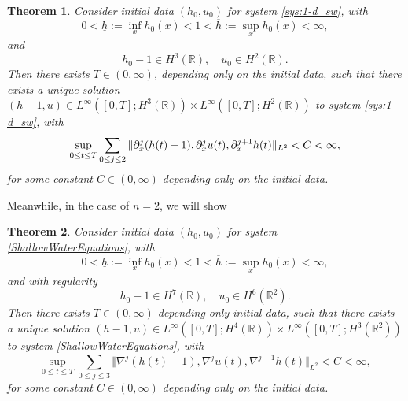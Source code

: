 \documentclass[reqno,11pt]{amsart}
\newcommand{\norm}[2]{\Vert #1 \Vert_{#2}}
\theoremstyle{plain}
\newtheorem{theorem}{Theorem}[section]
\theoremstyle{definition}
\numberwithin{equation}{section}
\begin{document}
\begin{theorem}
    \label{thm:1-d} Consider initial data $ (h_0, u_0)$ for system \eqref{sys:1-d_sw}, with
\begin{equation}
\label{h_initial-bound}
    0 < \underline h := \inf_{x} h_{0}(x) < 1 < \overline h := \sup_x h_{0}(x) < \infty,
\end{equation}
and
\begin{equation}
    \label{1-d-initial-regularity}
    h_0 - 1 \in H^3(\mathbb R), \quad  u_0 \in H^2(\mathbb R). 
\end{equation}
Then there exists $ T \in (0,\infty) $, depending only on the initial data, such that there exists a unique solution $ (h-1,u) \in L^\infty([0,T];H^3(\mathbb R)) \times L^\infty([0,T];H^2(\mathbb R)) $ to system \eqref{sys:1-d_sw}, with 
    \begin{equation}
        \label{1-d-a-priori-estimate}
        \sup_{0\leq t\leq T} \sum_{%
        0\leq j\leq 2
        }\norm{\partial_x^j(h(t)-1),\partial_x^j u(t), \partial_x^{j+1} h(t) }{L^2} < C <\infty,
    \end{equation}
    for some constant $ C \in (0,\infty) $ depending only on the initial data. 
\end{theorem}


Meanwhile, in the case of $ n=2 $, we will show
\begin{theorem}
    \label{MainTheoremLWP}
 Consider initial data $ (h_0, u_0) $ for system \eqref{ShallowWaterEquations}, with
\begin{equation}
    0 < \underline h := \inf_{x} h_{0}(x) < 1 < \overline h := \sup_x h_{0}(x) < \infty,
\end{equation}
and with regularity
\begin{equation}
    \label{n-d-initial-regularity}
    h_0 - 1 \in H^{7}(\mathbb R), \quad  u_0 \in H^{6}(\mathbb {R}^2). 
\end{equation}
Then there exists $ T \in (0,\infty) $ depending only initial data, such that there exists a unique solution $ (h-1,u) \in L^\infty([0,T];H^{4}(\mathbb R)) \times L^\infty([0,T];H^{3}(\mathbb {R}^2)) $ to system \eqref{ShallowWaterEquations}, with 
    \begin{equation}
        \sup_{0\leq t\leq T} \sum_{0\leq j\leq 3}\norm{\nabla^{j}(h(t)-1),\nabla^{j} u(t), \nabla^{j+1} h(t) }{L^2} < C <\infty,
    \end{equation}
    for some constant $ C \in (0,\infty) $ depending only on the initial data.
\end{theorem}
\end{document}
